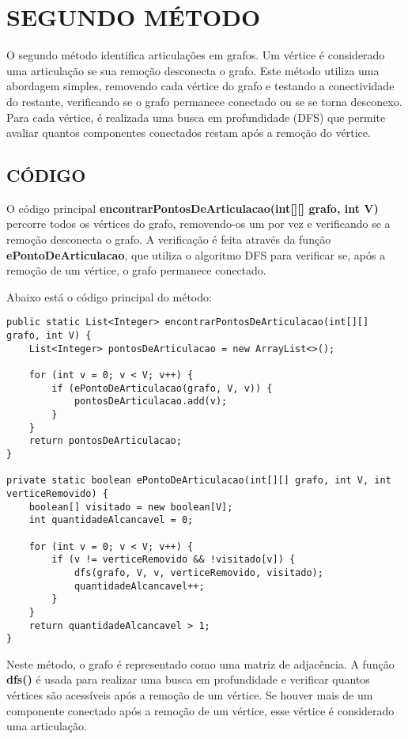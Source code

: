 \chapter{SEGUNDO MÉTODO}

O segundo método identifica articulações em grafos. Um vértice é considerado uma articulação se sua remoção desconecta o grafo. Este método utiliza uma abordagem simples, removendo cada vértice do grafo e testando a conectividade do restante, verificando se o grafo permanece conectado ou se se torna desconexo. Para cada vértice, é realizada uma busca em profundidade (DFS) que permite avaliar quantos componentes conectados restam após a remoção do vértice.

\section{\esp CÓDIGO}

O código principal \textbf{encontrarPontosDeArticulacao(int[][] grafo, int V)} percorre todos os vértices do grafo, removendo-os um por vez e verificando se a remoção desconecta o grafo. A verificação é feita através da função \textbf{ePontoDeArticulacao}, que utiliza o algoritmo DFS para verificar se, após a remoção de um vértice, o grafo permanece conectado.

Abaixo está o código principal do método:

\begin{verbatim}
public static List<Integer> encontrarPontosDeArticulacao(int[][] grafo, int V) {
    List<Integer> pontosDeArticulacao = new ArrayList<>();

    for (int v = 0; v < V; v++) {
        if (ePontoDeArticulacao(grafo, V, v)) {
            pontosDeArticulacao.add(v);
        }
    }
    return pontosDeArticulacao;
}

private static boolean ePontoDeArticulacao(int[][] grafo, int V, int verticeRemovido) {
    boolean[] visitado = new boolean[V];
    int quantidadeAlcancavel = 0;

    for (int v = 0; v < V; v++) {
        if (v != verticeRemovido && !visitado[v]) {
            dfs(grafo, V, v, verticeRemovido, visitado);
            quantidadeAlcancavel++;
        }
    }
    return quantidadeAlcancavel > 1;
}
\end{verbatim}

Neste método, o grafo é representado como uma matriz de adjacência. A função \textbf{dfs()} é usada para realizar uma busca em profundidade e verificar quantos vértices são acessíveis após a remoção de um vértice. Se houver mais de um componente conectado após a remoção de um vértice, esse vértice é considerado uma articulação.

